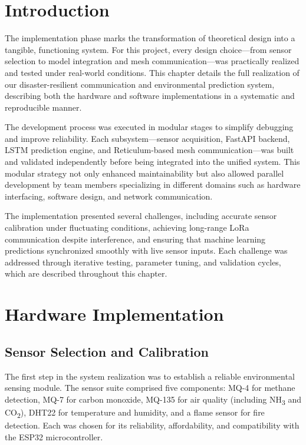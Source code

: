 
\section*{Introduction}
\label{sec:impl_intro}

The implementation phase marks the transformation of theoretical design into a tangible, functioning system. For this project, every design choice—from sensor selection to model integration and mesh communication—was practically realized and tested under real-world conditions. This chapter details the full realization of our disaster-resilient communication and environmental prediction system, describing both the hardware and software implementations in a systematic and reproducible manner.

The development process was executed in modular stages to simplify debugging and improve reliability. Each subsystem—sensor acquisition, FastAPI backend, LSTM prediction engine, and Reticulum-based mesh communication—was built and validated independently before being integrated into the unified system. This modular strategy not only enhanced maintainability but also allowed parallel development by team members specializing in different domains such as hardware interfacing, software design, and network communication.

The implementation presented several challenges, including accurate sensor calibration under fluctuating conditions, achieving long-range LoRa communication despite interference, and ensuring that machine learning predictions synchronized smoothly with live sensor inputs. Each challenge was addressed through iterative testing, parameter tuning, and validation cycles, which are described throughout this chapter.

\section{Hardware Implementation}
\label{sec:hardware_impl}

\subsection{Sensor Selection and Calibration}
\label{subsec:sensor_calibration}

The first step in the system realization was to establish a reliable environmental sensing module. The sensor suite comprised five components: MQ-4 for methane detection, MQ-7 for carbon monoxide, MQ-135 for air quality (including NH\textsubscript{3} and CO\textsubscript{2}), DHT22 for temperature and humidity, and a flame sensor for fire detection. Each was chosen for its reliability, affordability, and compatibility with the ESP32 microcontroller.

